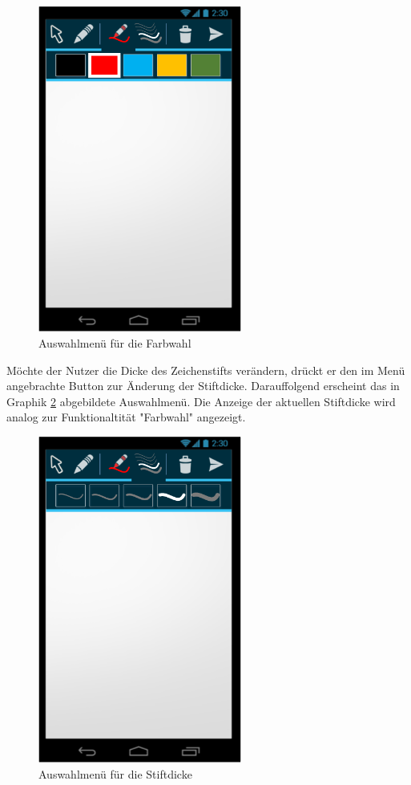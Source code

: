 \documentclass{chi-ext}
\begin{document}
\begin{figure}
  \centering
  \includegraphics[width=190pt]{img/android/mockup_color.png}
  \caption{Auswahlmenü für die Farbwahl}
  \label{fig:mockup_color}
\end{figure}

Möchte der Nutzer die Dicke des Zeichenstifts verändern, drückt er den im Menü angebrachte Button zur Änderung der Stiftdicke. Darauffolgend erscheint das in Graphik \ref{fig:mockup_pen} abgebildete Auswahlmenü. Die Anzeige der aktuellen Stiftdicke wird analog zur Funktionaltität "Farbwahl" angezeigt.

\begin{figure}
  \centering
  \includegraphics[width=190pt]{img/android/mockup_pen.png}
  \caption{Auswahlmenü für die Stiftdicke}
  \label{fig:mockup_pen}
\end{figure}
\end{document}
